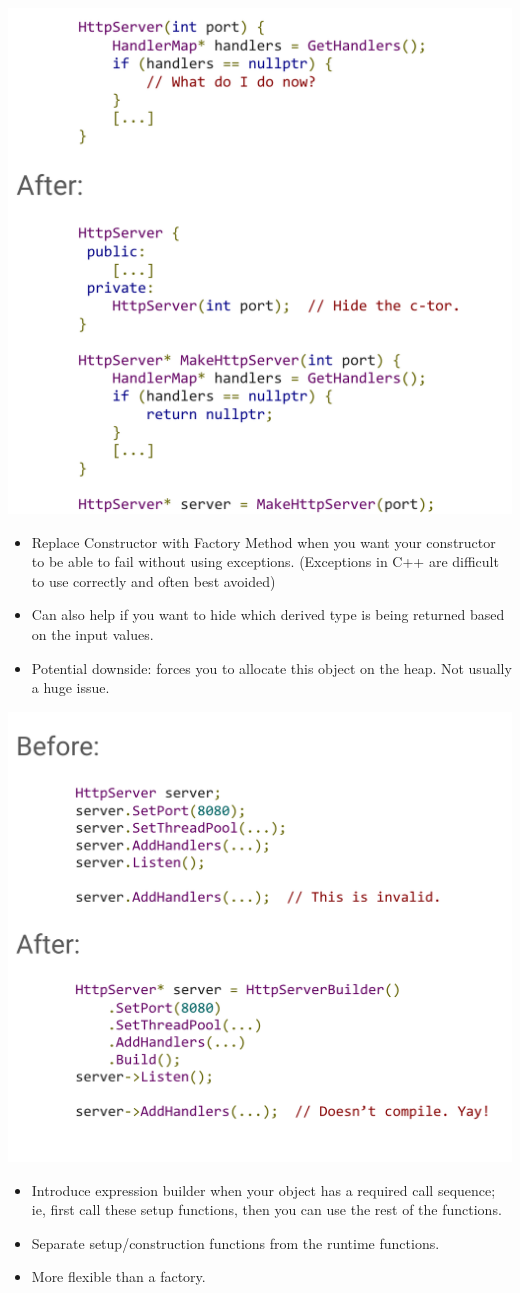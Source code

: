 \documentclass{article}
\begin{document}
\includegraphics*[width=0.6\linewidth]{refactorEx4.png}

\begin{center}
    \begin{itemize}
        \item Replace Constructor with Factory Method when you want your constructor to be able to fail without using exceptions. (Exceptions in C++ are difficult to use correctly and often best avoided)
        \item Can also help if you want to hide which derived type is being returned based on the input values.
        \item Potential downside: forces you to allocate this object on the heap. Not usually a huge issue.
    \end{itemize}
\end{center}

\includegraphics*[width=0.6\linewidth]{refactorEx5.png}

\begin{center}
    \begin{itemize}
        \item Introduce expression builder when your object has a required call sequence; ie, first call these setup functions, then you can use the rest of the functions. 
        \item Separate setup/construction functions from the runtime functions. 
        \item More flexible than a factory.
    \end{itemize}
\end{center}
\end{document}
